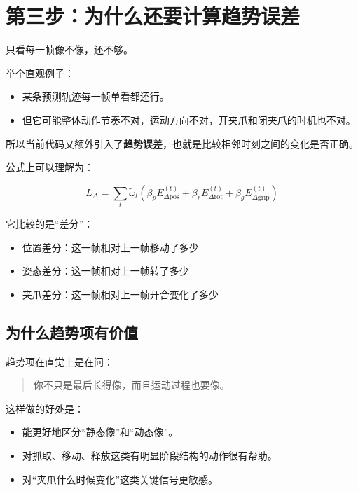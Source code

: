 \documentclass[12pt]{ctexart}
\begin{document}
\section{第三步：为什么还要计算趋势误差}

只看每一帧像不像，还不够。

举个直观例子：

\begin{itemize}
    \item 某条预测轨迹每一帧单看都还行。
    \item 但它可能整体动作节奏不对，运动方向不对，开夹爪和闭夹爪的时机也不对。
\end{itemize}

所以当前代码又额外引入了\textbf{趋势误差}，也就是比较相邻时刻之间的变化是否正确。

公式上可以理解为：

\begin{equation}
    L_{\Delta} =
    \sum_t \tilde{\omega}_t
    \left(
    \beta_p E^{(t)}_{\Delta\text{pos}}
    + \beta_r E^{(t)}_{\Delta\text{rot}}
    + \beta_g E^{(t)}_{\Delta\text{grip}}
    \right)
\end{equation}

它比较的是“差分”：

\begin{itemize}
    \item 位置差分：这一帧相对上一帧移动了多少
    \item 姿态差分：这一帧相对上一帧转了多少
    \item 夹爪差分：这一帧相对上一帧开合变化了多少
\end{itemize}

\subsection{为什么趋势项有价值}

趋势项在直觉上是在问：

\begin{quote}
    你不只是最后长得像，而且运动过程也要像。
\end{quote}

这样做的好处是：

\begin{itemize}
    \item 能更好地区分“静态像”和“动态像”。
    \item 对抓取、移动、释放这类有明显阶段结构的动作很有帮助。
    \item 对“夹爪什么时候变化”这类关键信号更敏感。
\end{itemize}
\end{document}
